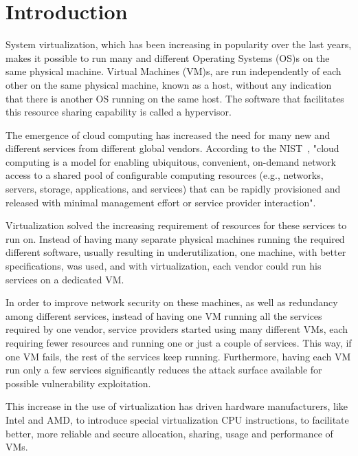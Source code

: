 \chapter{Introduction}\label{ch:intro}

System virtualization, which has been increasing in popularity over the last years, makes it possible to run many and different Operating Systems (OS)s on the same physical machine. Virtual Machines (VM)s, are run independently of each other on the same physical machine, known as a host, without any indication that there is another \ac{OS} running on the same host. The software that facilitates this resource sharing capability is called a hypervisor.

\par The emergence of cloud computing has increased the need for many new and different services from different global vendors. According to the \ac{NIST}~\cite{mell2011nist}, "cloud computing is a model for enabling ubiquitous, convenient, on-demand network access to a shared pool of configurable computing resources (e.g., networks, servers, storage, applications, and services) that can be rapidly provisioned and released with minimal management effort or service provider interaction".  

\par Virtualization solved the increasing requirement of resources for these services to run on. Instead of having many separate physical machines running the required different software, usually resulting in underutilization, one machine, with better specifications, was used, and with virtualization, each vendor could run his services on a dedicated \ac{VM}. 

\par In order to improve network security on these machines, as well as redundancy among different services, instead of having one VM running all the services required by one vendor, service providers started using many different \ac{VM}s, each requiring fewer resources and running one or just a couple of services. This way, if one VM fails, the rest of the services keep running. Furthermore, having each \ac{VM} run only a few services significantly reduces the attack surface available for possible vulnerability exploitation.

\par This increase in the use of virtualization has driven hardware manufacturers, like Intel and AMD, to introduce special virtualization \ac{CPU} instructions, to facilitate better, more reliable and secure allocation, sharing, usage and performance of \ac{VM}s. 

